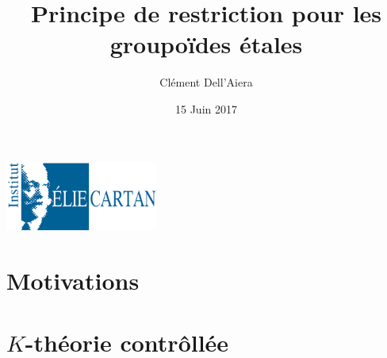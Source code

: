 \documentclass{beamer}
\title[First Steps with SCRATCH]{Principe de restriction pour les groupoïdes étales}
\author{Clément Dell'Aiera}
\institute{IECL}
\date{15 Juin 2017}
\begin{document}
\begin{frame}
  \titlepage
\begin{center}\includegraphics[width=5cm]{IECL.png}\end{center}
\end{frame}

\section{Motivations}


\section{$K$-théorie contrôllée}

\end{document}
